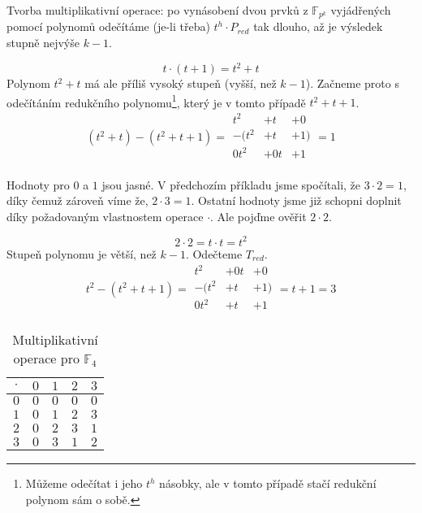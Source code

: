 Tvorba multiplikativní operace: po vynásobení dvou prvků z $\mathbb{F}_{p^k}$ vyjádřených pomocí
polynomů odečítáme (je-li třeba) $t^h \cdot P_{red}$ tak dlouho, až je výsledek stupně nejvýše
$k - 1$.

\begin{example}
$$t \cdot (t + 1) = t^2 + t$$
Polynom $t^2 + t$ má ale příliš vysoký stupeň (vyšší, než $k - 1$). Začneme proto s odečítáním
redukčního polynomu\footnote{Můžeme odečítat i jeho $t^h$ násobky, ale v tomto případě stačí
redukční polynom sám o sobě.}, který je v tomto případě $t^2 + t + 1$.
\[
    (t^2 + t) - (t^2 + t + 1)
    =
    \begin{array}{rrr}
        t^2&+t&+0 \\
       -(t^2&+t&+1) \\ \hline
        0t^2&+0t&+1 \\
        &&
    \end{array}
    = 1
\]
\end{example}

\begin{example}
    Hodnoty pro $0$ a $1$ jsou jasné. V předchozím příkladu jsme spočítali,
    že $3 \cdot 2 = 1$, díky čemuž zároveň víme že, $2 \cdot 3 = 1$. Ostatní
    hodnoty jsme již schopni doplnit díky požadovaným vlastnostem operace $\cdot$.
    Ale pojďme ověřit $2 \cdot 2$.

    $$2 \cdot 2 = t \cdot t = t^2$$
    Stupeň polynomu je větší, než $k - 1$. Odečteme $T_{red}$.
    \[
        t^2 - (t^2 + t + 1)
        =
        \begin{array}{rrr}
            t^2&+0t&+0 \\
           -(t^2&+t&+1) \\ \hline
            0t^2&+t&+1 \\
            &&
        \end{array}
        = t + 1 = 3
    \]

    \begin{table}[h]
        \centering
        \begin{tabular}{|c|c|c|c|c|}
        \hline
        $\cdot$ & $0$ & $1$ & $2$ & $3$ \\ \hline
        $0$     & $0$ & $0$ & $0$ & $0$ \\ \hline
        $1$     & $0$ & $1$ & $2$ & $3$ \\ \hline
        $2$     & $0$ & $2$ & $3$ & $1$ \\ \hline
        $3$     & $0$ & $3$ & $1$ & $2$ \\ \hline
        \end{tabular}
        \caption{Multiplikativní operace pro $\mathbb{F}_{4}$}
        \label{tab:F4_mul}
    \end{table}
\end{example}

